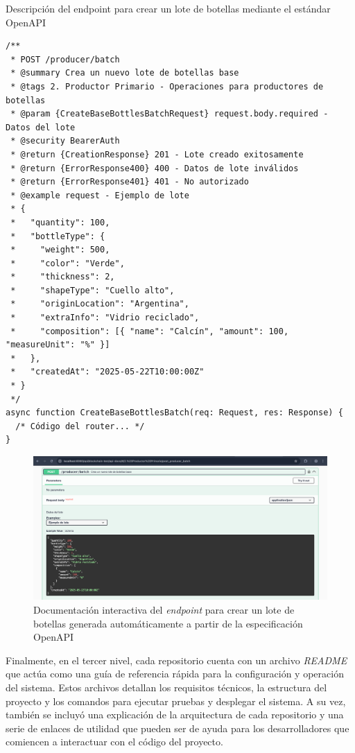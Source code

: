 \begin{listing}[!htb]
\caption{Descripción del endpoint para crear un lote de botellas mediante el estándar OpenAPI}
\label{listing:openapi-create-batch-code}
\begin{verbatim}
/** 
 * POST /producer/batch
 * @summary Crea un nuevo lote de botellas base
 * @tags 2. Productor Primario - Operaciones para productores de botellas
 * @param {CreateBaseBottlesBatchRequest} request.body.required - Datos del lote
 * @security BearerAuth
 * @return {CreationResponse} 201 - Lote creado exitosamente
 * @return {ErrorResponse400} 400 - Datos de lote inválidos
 * @return {ErrorResponse401} 401 - No autorizado
 * @example request - Ejemplo de lote
 * {
 *   "quantity": 100,
 *   "bottleType": {
 *     "weight": 500,
 *     "color": "Verde",
 *     "thickness": 2,
 *     "shapeType": "Cuello alto",
 *     "originLocation": "Argentina",
 *     "extraInfo": "Vidrio reciclado",
 *     "composition": [{ "name": "Calcín", "amount": 100, "measureUnit": "%" }]
 *   },
 *   "createdAt": "2025-05-22T10:00:00Z"
 * } 
 */
async function CreateBaseBottlesBatch(req: Request, res: Response) { 
  /* Código del router... */ 
}
\end{verbatim}
\end{listing}

\begin{figure}[!htb]
	\centering
	\includegraphics[width=\textwidth]{Figures/openapi-endpoint.png}
	\caption{Documentación interactiva del \textit{\gls{endpoint}} para crear un lote de botellas generada automáticamente a partir de la especificación OpenAPI}
	\label{fig:openapi-docs}
\end{figure}

Finalmente, en el tercer nivel, cada repositorio cuenta con un archivo \textit{README} que actúa como una guía de referencia rápida para la configuración y operación del sistema. Estos archivos detallan los requisitos técnicos, la estructura del proyecto y los comandos para ejecutar pruebas y desplegar el sistema. A su vez, también se incluyó una explicación de la arquitectura de cada repositorio y una serie de enlaces de utilidad que pueden ser de ayuda para los desarrolladores que comiencen a interactuar con el código del proyecto.

